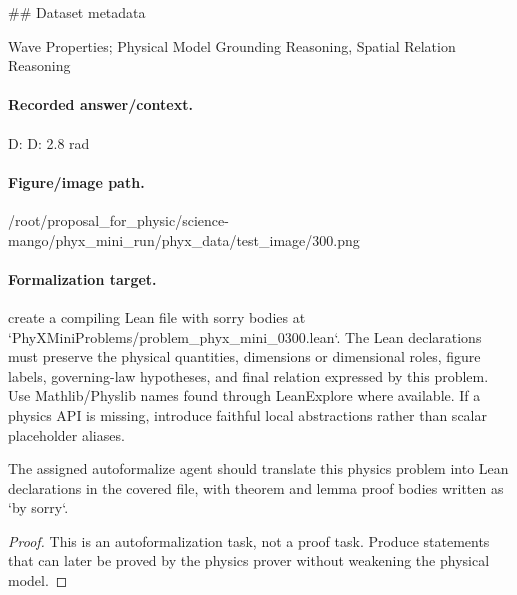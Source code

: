 \#\# Dataset metadata

Wave Properties; Physical Model Grounding Reasoning, Spatial Relation Reasoning

\paragraph{Recorded answer/context.}
D: D: 2.8 rad

\paragraph{Figure/image path.}
/root/proposal\_for\_physic/science-mango/phyx\_mini\_run/phyx\_data/test\_image/300.png

\paragraph{Formalization target.}
create a compiling Lean file with sorry bodies at `PhyXMiniProblems/problem\_phyx\_mini\_0300.lean`. The Lean declarations must preserve the physical quantities, dimensions or dimensional roles, figure labels, governing-law hypotheses, and final relation expressed by this problem.
Use Mathlib/Physlib names found through LeanExplore where available. If a physics API is missing, introduce faithful local abstractions rather than scalar placeholder aliases.

\begin{theorem}
\label{thm:physics:phyx_mini_0300:target}
The assigned autoformalize agent should translate this physics problem into Lean declarations in the covered file, with theorem and lemma proof bodies written as `by sorry`.
\end{theorem}
\begin{proof}
This is an autoformalization task, not a proof task. Produce statements that can later be proved by the physics prover without weakening the physical model.
\end{proof}

